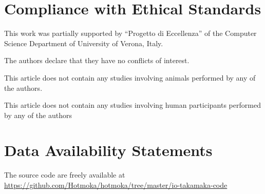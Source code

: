 \section{Compliance with Ethical Standards}

This work was partially supported by ``Progetto di Eccellenza'' of the Computer Science Department of University of Verona, Italy.

The authors declare that they have no conflicts of interest.

This article does not contain any studies involving animals performed by any of the authors.

This article does not contain any studies involving human participants performed by any of the authors

\section{Data Availability Statements}

The source code are freely available at \url{https://github.com/Hotmoka/hotmoka/tree/master/io-takamaka-code}